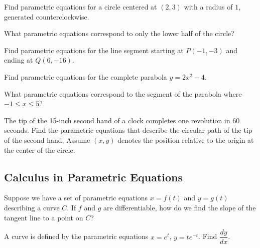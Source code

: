 \documentclass[12pt]{article}
\begin{document}
\Example Find parametric equations for a circle centered at $(2,3)$ with a radius of $1$, generated counterclockwise. 

\vfill

What parametric equations correspond to only the lower half of the circle?

\vspace{30mm}

\newpage


\Example Find parametric equations for the line segment starting at $P(-1,-3)$ and ending at $Q(6,-16)$.

\vfill

\vfill

\Example Find parametric equations for the complete parabola $y=2x^2-4$. 

\vspace{45mm}

What parametric equations correspond to the segment of the parabola where $-1\leq x\leq 5$?

\vspace{30mm}

\newpage

\Example The tip of the 15-inch second hand of a clock completes one revolution in 60 seconds. Find the parametric equations that describe the circular path of the tip of the second hand. Assume $(x,y)$ denotes the position relative to the origin at the center of the circle.

\vfill

\subsection*{Calculus in Parametric Equations}

Suppose we have a set of parametric equations $x=f(t)$ and $y=g(t)$ describing a curve $C$. If $f$ and $g$ are differentiable, how do we find the slope of the tangent line to a point on $C$?

\vspace{40mm}

\Example A curve is defined by the parametric equations $x=e^t$, $y=te^{-t}$. Find $\dfrac{dy}{dx}$.

\vspace{45mm}

%
\end{document}
